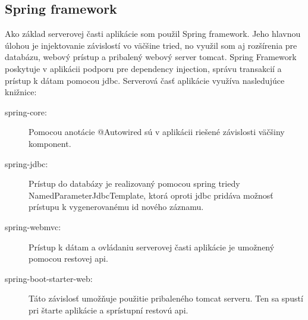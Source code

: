 	\subsection{Spring framework}
		Ako základ serverovej časti aplikácie som použil Spring framework. Jeho hlavnou úlohou je injektovanie závislostí vo väčšine tried, no využil som aj rozšírenia pre databázu, webový prístup a pribalený webový server tomcat.
		Spring Framework poskytuje v aplikácii podporu pre dependency injection, správu transakcií a prístup k dátam pomocou jdbc. Serverová časť aplikácie využíva nasledujúce knižnice:
		\begin{description}
			\item[spring-core:] Pomocou anotácie @Autowired sú v aplikácii riešené závislosti väčšiny komponent.
			\item[spring-jdbc:] Prístup do databázy je realizovaný pomocou spring triedy NamedParameterJdbcTemplate, ktorá oproti jdbc pridáva možnosť prístupu k vygenerovanému id nového záznamu.
			\item[spring-webmvc:] Prístup k dátam a ovládaniu serverovej časti aplikácie je umožnený pomocou restovej api.
			\item[spring-boot-starter-web:] Táto závislosť umožňuje použitie pribaleného tomcat serveru. Ten sa spustí pri štarte aplikácie a sprístupní restovú api.
		\end{description}


